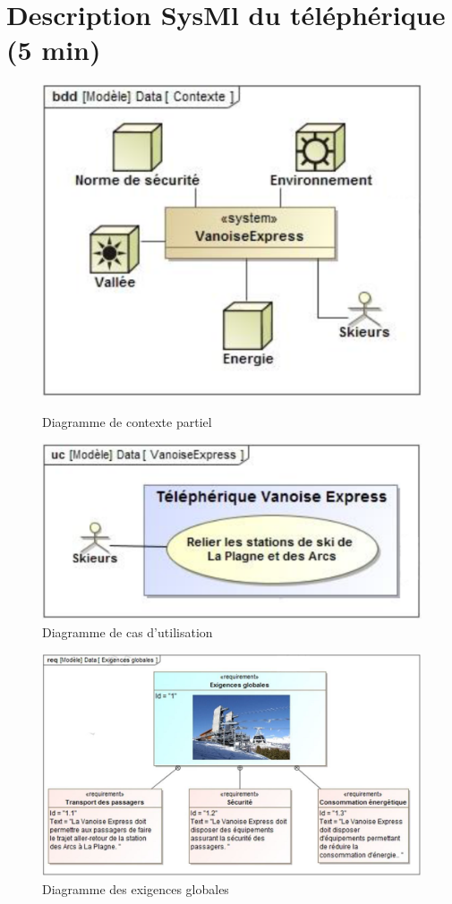 \section{Description SysMl du téléphérique (5 min)}

\begin{figure}[!h]
\begin{minipage}{0.45\linewidth}
\centering
\includegraphics[width=0.8\linewidth]{img/fig08}
\caption{Diagramme de contexte partiel}
\label{fig08}
\end{minipage}\hfill
\begin{minipage}{0.45\linewidth}
\centering
\includegraphics[width=0.8\linewidth]{img/fig09}
\caption{Diagramme de cas d'utilisation}
\label{fig09}
\end{minipage}
\end{figure}

\begin{figure}[!h]
\centering
\includegraphics[width=0.8\linewidth]{img/fig10}
\caption{Diagramme des exigences globales}
\label{fig10}
\end{figure}

